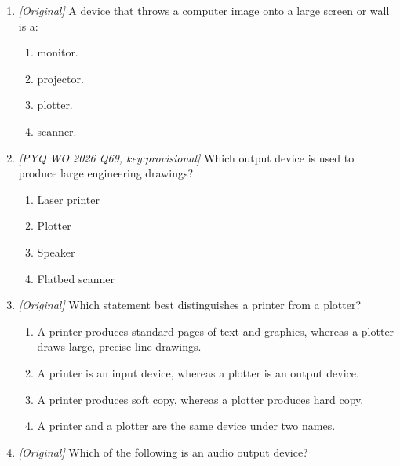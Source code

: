 \documentclass[11pt]{article}
\begin{document}
\begin{enumerate}[label=\textbf{Q\arabic*.}, leftmargin=*]
\begin{enumerate}[label=\Roman*.]
    \item A printer produces hard copy.
    \item A projector is an input device.
  \end{enumerate}
  \begin{enumerate}[label=\Alph*.]
    \item I and II only
    \item II and III only
    \item I and III only
    \item I, II and III
  \end{enumerate}
\item \textit{[Original]} A device that throws a computer image onto a large
  screen or wall is a:
  \begin{enumerate}[label=\Alph*.]
    \item monitor.
    \item projector.
    \item plotter.
    \item scanner.
  \end{enumerate}
\item \textit{[PYQ WO 2026 Q69, key:provisional]} Which output device is used
  to produce large engineering drawings?
  \begin{enumerate}[label=\Alph*.]
    \item Laser printer
    \item Plotter
    \item Speaker
    \item Flatbed scanner
  \end{enumerate}
\item \textit{[Original]} Which statement best distinguishes a printer from a
  plotter?
  \begin{enumerate}[label=\Alph*.]
    \item A printer produces standard pages of text and graphics, whereas a
      plotter draws large, precise line drawings.
    \item A printer is an input device, whereas a plotter is an output device.
    \item A printer produces soft copy, whereas a plotter produces hard copy.
    \item A printer and a plotter are the same device under two names.
  \end{enumerate}
\item \textit{[Original]} Which of the following is an audio output device?
  \begin{enumerate}[label=\Alph*.]

\end{enumerate}
\end{enumerate}
\end{document}
